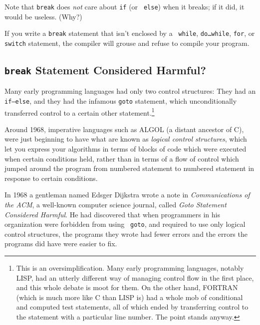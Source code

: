 \begin{flushleft}
\verb% do { % \\*
\verb%     . . . % \\*
\verb%     if ( . . . ) % \\*
\verb%         if ( . . . ) % \\*
\verb%             break ; % \\*
\verb%     . . . % \\*
\verb% } while ( . . . ) ; % \\*
\breakhere
\end{flushleft}

Note that {\tt break} does {\em not}\/ care about {\tt if} (or {\tt
else}) when it breaks; if it did, it would be useless.  (Why?)

If you write a {\tt break} statement that isn't enclosed by a {\tt
while}, {\tt do{\rm\ldots}while}, {\tt for}, or {\tt switch} statement,
the compiler will grouse and refuse to compile your program.

\subsection{{\tt break} Statement Considered Harmful?}

Many early programming languages had only two control structures: They
had an {\tt if{\rm--}else}, and they had the infamous {\tt goto}
statement, which unconditionally transferred control to a certain other
statement.\footnote{This is an oversimplification.  Many early
programming languages, notably LISP, had an utterly different way of
managing control flow in the first place, and this whole debate is moot
for them.  On the other hand, FORTRAN (which is much more like C than
LISP is) had a whole mob of conditional and computed test statements,
all of which ended by transferring control to the statement with a
particular line number.  The point stands anyway.}

Around 1968, imperative languages such as ALGOL (a distant ancestor of
C), were just beginning to have what are known as {\em logical control
structures}, which let you express your algorithms in terms of blocks of
code which were executed when certain conditions held, rather than in
terms of a flow of control which jumped around the program from
numbered statement to numbered statement in response to certain
conditions.

In 1968 a gentleman named Edsger Dijkstra wrote a note in {\em
Communications of the ACM}\/, a well-known computer science journal,
called {\em Goto Statement Considered Harmful}.  He had discovered that
when programmers in his organization were forbidden from using {\tt
goto}, and required to use only logical control structures, the programs
they wrote had fewer errors and the errors the programs did have were
easier to fix.

